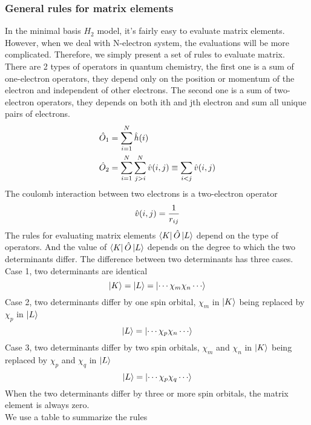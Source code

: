 \documentclass[11pt]{article}
\begin{document}
\subsubsection{General rules for matrix elements}
In the minimal basis $H_2$ model, it's fairly easy to evaluate matrix elements. However, when we deal with N-electron system, the evaluations will be
more complicated. Therefore, we simply present a set of rules to evaluate matrix.\\
There are 2 types of operators in quantum chemistry, the first one is a sum of one-electron operators, they depend only on the position or momentum of the electron and independent
of other electrons. The second one is a sum of two-electron operators, they depends on both ith and jth electron and sum all unique pairs of electrons. 
\begin{align}
    \Hat{O}_1&=\sum_{i=1}^{N}\Hat{h}(i)\\
    \Hat{O}_2&=\sum_{i=1}^{N}\sum_{j>i}^{N}\Hat{v}(i,j)\equiv\sum_{i<j}\Hat{v}(i,j)
\end{align} 
The coulomb interaction between two electrons is a two-electron operator
\begin{equation}
    \Hat{v}(i,j)=\frac{1}{r_{ij}}
\end{equation}
The rules for evaluating matrix elements $\bra{K}\Hat{O}\ket{L}$ depend on the type of operators. And the value of $\bra{K}\Hat{O}\ket{L}$ depends on the degree to which the two
determinants differ. The difference between two determinants has three cases. \\
Case 1, two determinants are identical
\begin{equation}
    \ket{K}=\ket{L}=\ket{\cdots\chi_m\chi_n\cdots}
\end{equation}
Case 2, two determinants differ by one spin orbital, $\chi_m$ in $\ket{K}$ being replaced by $\chi_p$ in $\ket{L}$
\begin{equation}
    \ket{L}=\ket{\cdots\chi_p\chi_n\cdots}
\end{equation}
Case 3, two determinants differ by two spin orbitals, $\chi_m$ and $\chi_n$ in $\ket{K}$ being replaced by $\chi_p$ and $\chi_q$ in $\ket{L}$
\begin{equation}
    \ket{L}=\ket{\cdots\chi_p\chi_q\cdots}
\end{equation}
When the two determinants differ by three or more spin orbitals, the matrix element is always zero.\\
We use a table to summarize the rules
\end{document}
